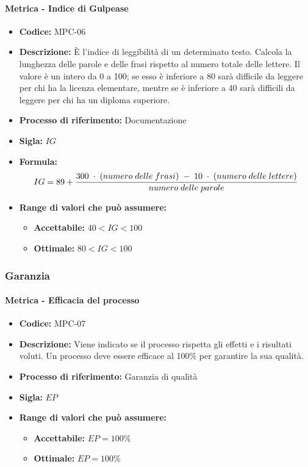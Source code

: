     \paragraph{Metrica - Indice di Gulpease}
    \begin{itemize}
        \item \textbf{Codice:} MPC-06
        \item \textbf{Descrizione:} È l'indice di leggibilità di un determinato testo. Calcola la lunghezza delle parole e delle frasi rispetto al numero totale delle lettere. Il valore è un intero da 0 a 100; se esso è inferiore a 80 sarà difficile da leggere per chi ha la licenza elementare, mentre se è inferiore a 40 sarà difficili da leggere per chi ha un diploma superiore.
        \item \textbf{Processo di riferimento:} Documentazione
        \item \textbf{Sigla:} $IG$
        \item \textbf{Formula:} $$IG = 89 + {{300 \; \cdot \; (numero\; delle \; frasi) \; - \; 10 \; \cdot \; (numero \; delle \; lettere)}\over numero \; delle \; parole}$$
        \item \textbf{Range di valori che può assumere:}
        \begin{itemize}
            \item \textbf{Accettabile:} $40 < IG < 100$
            \item \textbf{Ottimale:} $80 < IG < 100$
        \end{itemize}
    \end{itemize}

\subsubsection{Garanzia}
    \paragraph{Metrica - Efficacia del processo}
    \begin{itemize}
        \item \textbf{Codice:} MPC-07
        \item \textbf{Descrizione:} Viene indicato se il processo rispetta gli effetti e i risultati voluti. Un processo deve essere efficace al 100\% per garantire la sua qualità.
        \item \textbf{Processo di riferimento:} Garanzia di qualità
        \item \textbf{Sigla:} $EP$
        \item \textbf{Range di valori che può assumere:}
        \begin{itemize}
            \item \textbf{Accettabile:} $EP = 100\%$
            \item \textbf{Ottimale:} $EP = 100\%$
        \end{itemize}
    \end{itemize}

